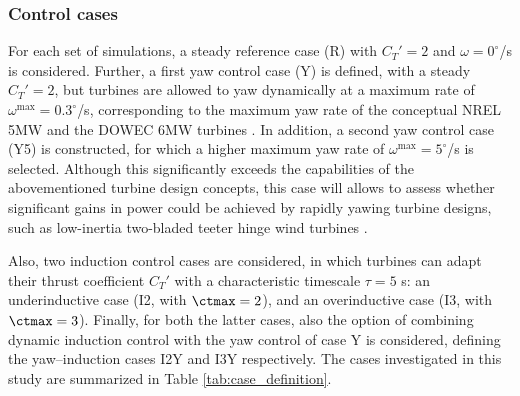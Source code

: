 \subsubsection{Control cases}

For each set of simulations, a steady reference case (R) with $C_T' = 2$ and $\omega = 0^\circ$/s is considered. Further, a first yaw control case (Y) is defined, with a steady $C_T'=2$, but turbines are allowed to yaw dynamically at a maximum rate of $\omega^{\text{max}} = 0.3^\circ$/s, corresponding to the maximum yaw rate of the conceptual NREL 5MW and the DOWEC 6MW turbines \citep{jonkman2009definition, kooijman2003dowec}. In addition, a second yaw control case (Y5) is constructed, for which a higher maximum yaw rate of $\omega^{\text{max}} = 5^\circ$/s is selected. Although this significantly exceeds the capabilities of the abovementioned turbine design concepts, this case will allows to assess whether significant gains in power could be achieved by rapidly yawing turbine designs, such as low-inertia two-bladed teeter hinge wind turbines \citep{kim2014yaw}. 

Also, two induction control cases are considered, in which turbines can adapt their thrust coefficient $C_T'$ with a characteristic timescale $\tau = 5$ s: an underinductive case (I2, with $\ctmax = 2$), and an overinductive case (I3, with $\ctmax = 3$). Finally, for both the latter cases, also the option of combining dynamic induction control with the yaw control of case Y is considered, defining the yaw--induction cases I2Y and I3Y respectively. The cases investigated in this study are summarized in Table \ref{tab:case_definition}. 

